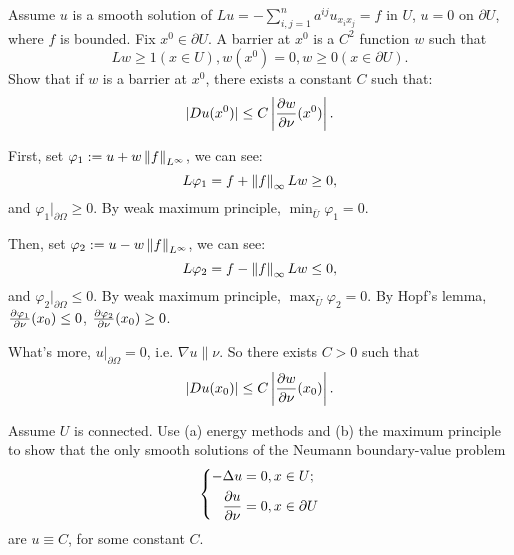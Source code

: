 \begin{exercise}
    Assume $u$ is a smooth solution of $Lu=-\sum_{i,j=1}^{n}a^{ij}u_{x_{i}x_{j}}=f$ in $U$, $u=0$ on $\partial U$, where $f$ is bounded. Fix $x^{0}\in\partial U$. A barrier at $x^{0}$ is a $C^{2}$ function $w$ such that
    \begin{equation}
        Lw\ge 1(x\in U),w(x^{0})=0,w\ge 0(x\in\partial U).
    \end{equation}
    Show that if $w$ is a barrier at $x^{0}$, there exists a constant $C$ such that:
    \begin{equation}
        |Du(x^{0})|\le C\left|\frac{\partial w}{\partial \nu}(x^{0})\right|.
    \end{equation}
\end{exercise}
\begin{solution}
    First, set $\varphi_{1}:=u+w\left\|f\right\|_{L^{\infty}}$, we can see:
    \begin{equation}
        L\varphi_{1}=f+\left\|f\right\|_{\infty}Lw\ge 0,
    \end{equation}
    and $\varphi_{1}|_{\partial\Omega}\ge 0$. By weak maximum principle, $\min_{\bar{U}}\varphi_{1}=0$. 

    Then, set $\varphi_{2}:=u-w\left\|f\right\|_{L^{\infty}}$, we can see:
    \begin{equation}
        L\varphi_{2}=f-\left\|f\right\|_{\infty}Lw\le 0,
    \end{equation}
    and $\varphi_{2}|_{\partial\Omega}\le 0$. By weak maximum principle, $\max_{\bar{U}}\varphi_{2}=0$. By Hopf's lemma, $\frac{\partial \varphi_{1}}{\partial \nu}(x_{0})\le 0$, $\frac{\partial \varphi_{2}}{\partial \nu}(x_{0})\ge 0$.

    What's more, $u|_{\partial\Omega}=0$, i.e. $\nabla u\parallel \nu$. So there exists $C>0$ such that 
    \begin{equation}
        |Du(x_{0})|\le C\left|\frac{\partial w}{\partial \nu}(x_{0})\right|.
    \end{equation}
\end{solution}
\begin{exercise}
    Assume $U$ is connected. Use (a) energy methods and (b) the maximum principle to show that the only smooth solutions of the Neumann boundary-value problem
    \begin{equation}
        \left\{
            \begin{aligned}
                -\Delta u&=0,x\in U;\\
                \frac{\partial u}{\partial \nu}&=0,x\in\partial U
            \end{aligned}
        \right.
    \end{equation}
    are $u\equiv C$, for some constant $C$.
\end{exercise}
